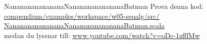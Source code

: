 \begin{SlideExtra}{NanananananananaNanananananananaBatman}\SlideFontTiny
Prova denna kod:
\href{https://github.com/lunduniversity/introprog/blob/master/compendium/examples/workspace/w05-seqalg/src/NanananananananaNanananananananaBatman.scala}{compendium/examples/workspace/w05-seqalg/src/\\NanananananananaNanananananananaBatman.scala} \\

medan du lyssnar till: \href{https://www.youtube.com/watch?v=oDc-1zfffMw}{www.youtube.com/watch?v=oDc-1zfffMw}

\vspace{-0.7em}
\end{SlideExtra}
\fi



